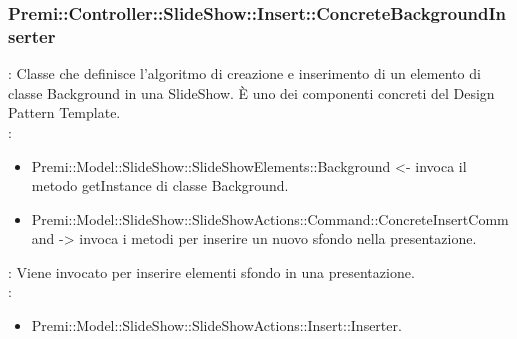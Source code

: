 {			\subsubsection{Premi::Controller::SlideShow::Insert::ConcreteBackgroundInserter}{
							\textbf{\tipo}: Classe che definisce l'algoritmo di creazione e inserimento di un elemento di classe Background in una SlideShow. È uno dei componenti concreti del Design Pattern Template.\\
			                \textbf{\relaz}: 
							\begin{itemize}
								\item Premi::Model::SlideShow::SlideShowElements::Background <- invoca il metodo getInstance di classe Background.
								\item Premi::Model::SlideShow::SlideShowActions::Command::ConcreteInsertCommand -> invoca i metodi per inserire un nuovo sfondo nella presentazione.
							\end{itemize} 
							\textbf{\interfacce}: Viene invocato per inserire elementi sfondo in una presentazione.\\
			                \textbf{\base}: 
			                    \begin{itemize}
			                    \item Premi::Model::SlideShow::SlideShowActions::Insert::Inserter.
			                    \end{itemize}
						}
	}
    
